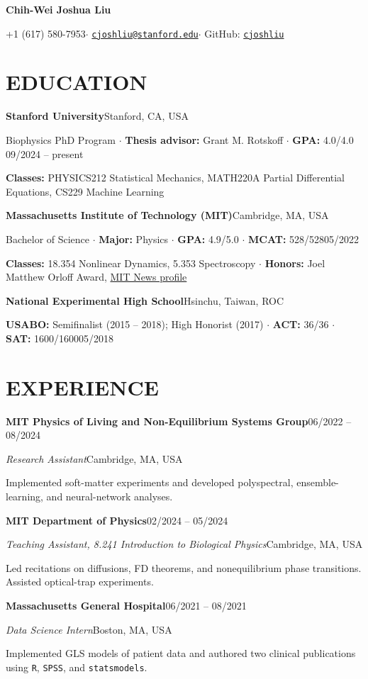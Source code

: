 \documentclass[11pt,letterpaper]{article}
\newcommand{\entry}[2]{\textbf{#1}\hfill #2\par}
\begin{document}
\fontsize{10.5}{12}\selectfont
\begin{center}
{\fontsize{18}{22}\selectfont\bfseries Chih-Wei Joshua Liu}\par
\vspace{4pt}
+1 (617) 580-7953\enspace$\cdot$\enspace
\href{mailto:cjoshliu@stanford.edu}{\texttt{cjoshliu@stanford.edu}}\enspace$\cdot$\enspace
GitHub: \href{https://github.com/cjoshliu}{\texttt{cjoshliu}}
\end{center}
\vspace{-14pt}

\section{EDUCATION}
\entry{Stanford University}{Stanford, CA, USA}
Biophysics PhD Program $\cdot$ \textbf{Thesis advisor:} Grant M. Rotskoff $\cdot$ \textbf{GPA:} 4.0/4.0 \hfill 09/2024 -- present\par
\textbf{Classes:} PHYSICS212 Statistical Mechanics, MATH220A Partial Differential Equations, CS229 Machine Learning\par

\vspace{4pt}
\entry{Massachusetts Institute of Technology (MIT)}{Cambridge, MA, USA}
Bachelor of Science $\cdot$ \textbf{Major:} Physics $\cdot$ \textbf{GPA:} 4.9/5.0 $\cdot$ \textbf{MCAT:} 528/528\hfill 05/2022\par
\textbf{Classes:} 18.354 Nonlinear Dynamics, 5.353 Spectroscopy $\cdot$ \textbf{Honors:} Joel Matthew Orloff Award, \href{https://news.mit.edu/2022/physics-gut-brain-health-chih-wei-joshua-liu-0603}{MIT News profile} \par
\vspace{4pt}
\entry{National Experimental High School}{Hsinchu, Taiwan, ROC}
\textbf{USABO:} Semifinalist (2015 -- 2018); High Honorist (2017) $\cdot$ \textbf{ACT:} 36/36 $\cdot$ \textbf{SAT:} 1600/1600\hfill 05/2018

\section{EXPERIENCE}
\entry{MIT Physics of Living and Non-Equilibrium Systems Group}{06/2022 -- 08/2024}\par
\textit{Research Assistant}\hfill Cambridge, MA, USA\par
Implemented soft-matter experiments and developed polyspectral, ensemble-learning, and neural-network analyses.\par
\entry{MIT Department of Physics}{02/2024 -- 05/2024}
\textit{Teaching Assistant, 8.241 Introduction to Biological Physics}\hfill Cambridge, MA, USA\par
Led recitations on diffusions, FD theorems, and nonequilibrium phase transitions.
Assisted optical-trap experiments.
\par
\entry{Massachusetts General Hospital}{06/2021 -- 08/2021}
\textit{Data Science Intern}\hfill Boston, MA, USA\par
Implemented GLS models of patient data and authored two clinical publications using \texttt{R}, \texttt{SPSS}, and \texttt{statsmodels}.\par
\end{document}
